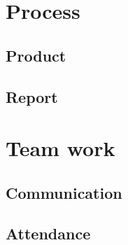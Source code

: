 \section{Process}

\subsection{Product}

\subsection{Report}

\section{Team work}

\subsection{Communication}

\subsection{Attendance}

